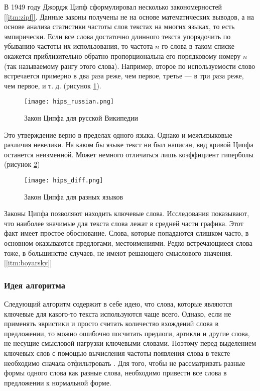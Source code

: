В 1949 году Джордж Ципф сформулировал несколько закономерностей \hyperref[itm:zipf]{[\ref{itm:zipf}]}. Данные законы получены не на основе математических выводов, а на
основе анализа статистики частоты слов текстах на многих языках, то есть эмпирически.
Если все слова достаточно длинного текста упорядочить по убыванию
частоты их использования, то частота $n$-го слова в таком списке окажется
приблизительно обратно пропорциональна его порядковому номеру $n$ (так
называемому рангу этого слова). Например, второе по используемости
слово встречается примерно в два раза реже, чем первое, третье — в три
раза реже, чем первое, и т. д. (рисунок \hyperref[fig:hips_rus]{\ref{fig:hips_rus}}).
\begin{figure}[H]
\centering
\texttt{[image: hips\_russian.png]}
\caption{Закон Ципфа для русской Википедии}
\label{fig:hips_rus}
\end{figure}
Это утверждение верно в пределах одного языка. Однако и межъязыковые различия невелики. На каком бы языке текст ни был написан, вид
кривой Ципфа останется неизменной. Может немного отличаться лишь коэффициент гиперболы (рисунок \hyperref[fig:hips_diff]{\ref{fig:hips_diff}})
\begin{figure}[H]
\centering
\texttt{[image: hips\_diff.png]}
\caption{Закон Ципфа для разных языков}
\label{fig:hips_diff}
\end{figure}
Законы Ципфа позволяют находить ключевые слова.
Исследования показывают, что наиболее значимые для текста слова
лежат в средней части графика. Этот факт имеет простое обоснование. Слова, которые попадаются слишком часто, в основном оказываются предлогами, местоимениями. Редко встречающиеся слова тоже, в большинстве случаев, не имеют решающего смыслового значения. \hyperref[itm:boyarsky]{[\ref{itm:boyarsky}]}

\subsubsection{Идея алгоритма}

Следующий алгоритм содержит в себе идею, что слова, которые являются ключевые для какого-то текста используются чаще всего. Однако, если не применять эвристики и просто считать количество вхождений слова в предложении, то можно ошибочно посчитать предлоги, артикли и другие слова, не несущие смысловой нагрузки ключевыми словами. Поэтому перед выделением ключевых слов с помощью вычисления частоты появления слова в тексте необходимо сначала отфильтровать . Для того, чтобы не рассматривать разные формы одного слова как разные слова, необходимо привести все слова в предложении к нормальной форме.

